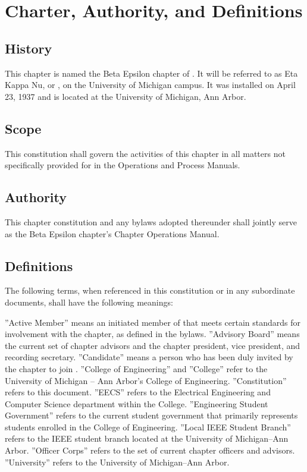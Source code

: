 \chapter{Charter, Authority, and Definitions}\label{sec:definitions}

\section{History}
This chapter is named the Beta Epsilon chapter of \hkn. It will be referred to as Eta Kappa Nu, or \hkn, on the University of Michigan campus. It was installed on April 23, 1937 and is located at the University of Michigan, Ann Arbor.

\section{Scope}
This constitution shall govern the activities of this chapter in all matters not specifically provided for in the \hkn Operations and Process Manuals.

\section{Authority}
This chapter constitution and any bylaws adopted thereunder shall jointly serve as the Beta Epsilon chapter's Chapter Operations Manual.

\section{Definitions}
The following terms, when referenced in this constitution or in any subordinate documents, shall have the following meanings:
\begin{enumsubsection}

\itemnotoc ''Active Member'' means an initiated member of \hkn that meets certain standards for involvement with the chapter, as defined in the bylaws.
\itemnotoc ''Advisory Board'' means the current set of chapter advisors and the chapter president, vice president, and recording secretary.
\itemnotoc ''Candidate'' means a person who has been duly invited by the chapter to join \hkn.
\itemnotoc ''College of Engineering'' and ''College'' refer to the University of Michigan -- Ann Arbor's College of Engineering.
\itemnotoc ''Constitution'' refers to this document.
\itemnotoc ''EECS'' refers to the Electrical Engineering and Computer Science department within the College.
\itemnotoc ''Engineering Student Government'' refers to the current student government that primarily represents students enrolled in the College of Engineering.
\itemnotoc ''Local IEEE Student Branch'' refers to the IEEE student branch located at the University of Michigan--Ann Arbor.
\itemnotoc ''Officer Corps'' refers to the set of current chapter officers and advisors.
\itemnotoc ''University'' refers to the University of Michigan--Ann Arbor.

\end{enumsubsection}

